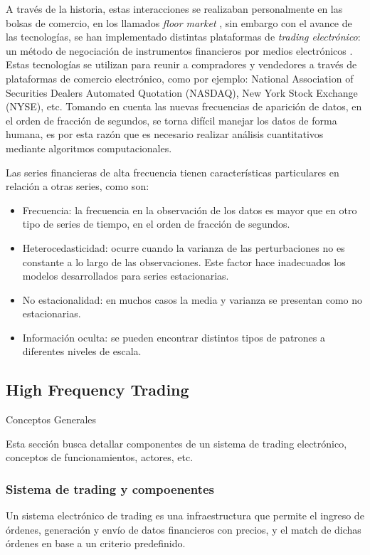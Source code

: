 A través de la historia, estas interacciones se realizaban personalmente en las
bolsas de comercio, en los llamados \emph{floor market}
\cite{jain2005financial}, sin embargo con el avance de las tecnologías, se han
implementado distintas plataformas de \emph{trading electrónico}: un método de
negociación de instrumentos financieros por medios electrónicos
\cite{weston2002electronic}. Estas tecnologías se utilizan para reunir a
compradores y vendedores a través de plataformas de comercio electrónico, como
por ejemplo: National Association of Securities Dealers Automated Quotation
(NASDAQ), New York Stock Exchange (NYSE), etc. Tomando en cuenta las nuevas
frecuencias de aparición de datos, en el orden de fracción de segundos, se
torna difícil manejar los datos de forma humana, es por esta razón que es
necesario realizar análisis cuantitativos mediante algoritmos computacionales.

Las series financieras de alta frecuencia tienen características particulares
en relación a otras series, como son: 
\begin{itemize}
	\item Frecuencia: la frecuencia en la observación de los datos es mayor que
en otro tipo de series de tiempo, en el orden de fracción de segundos.
	\item Heterocedasticidad: ocurre cuando la varianza de las perturbaciones
no es constante a lo largo de las observaciones.  Este factor hace inadecuados
los modelos desarrollados para series estacionarias.
	\item No estacionalidad: en muchos casos la media y varianza se presentan
como no estacionarias.
	\item Información oculta: se pueden encontrar distintos tipos de patrones a
diferentes niveles de escala.
\end{itemize}


\subsection{High Frequency Trading}

Conceptos Generales

Esta sección busca detallar componentes de un sistema de trading electrónico, 
conceptos de funcionamientos, actores, etc.

\subsubsection{Sistema de trading y compoenentes}
Un sistema electrónico de trading es una infraestructura que permite el ingreso
de órdenes, generación y envío de datos financieros con precios, y el match de
dichas órdenes en base a un criterio predefinido.


